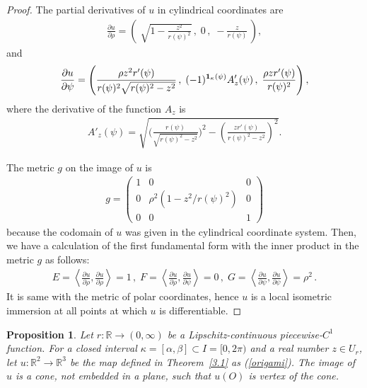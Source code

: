 \documentclass{amsart}
\theoremstyle{plain}
\newtheorem{proposition}[theorem]{Proposition}
\theoremstyle{definition}
\theoremstyle{remark}
\begin{document}
\begin{proof}%
The partial derivatives of $u$ in cylindrical coordinates are
\begin{align*}
\frac{\partial u}{\partial\rho}=\left(\;\sqrt{1-\frac{z^2}{r(\psi)^2}}\,,\;0\,,\;-\frac{z}{r(\psi)}\,\right),
\end{align*}
and
\begin{align*}
\frac{\partial u}{\partial\psi}=\left(\frac{\rho z^2r'(\psi)}{r(\psi)^2\sqrt{r(\psi)^2-z^2}}\,,\;(-1)^{\bold{1}_{\kappa}(\psi)}A'_z(\psi)\,,\;\frac{\rho zr'(\psi)}{r(\psi)^2}\right),
\end{align*}
where the derivative of the function $A_z$ is
\begin{align*}
A'_z(\psi)=\sqrt{\biggl(\frac{r(\psi)}{\sqrt{r(\psi)^2-z^2}}\biggr)^2-\left(\frac{zr'(\psi)}{r(\psi)^2-z^2}\right)^2}.
\end{align*}

The metric $g$ on the image of $u$ is
\begin{align*}
g=\begin{pmatrix}1&0&0\\0&\rho^2\left(1- {z^2}/{r(\psi)^2}\right)&0\\0&0&1\end{pmatrix}
\end{align*}
because the codomain of $u$ was given in the cylindrical coordinate system.
Then, we have a calculation of the first fundamental form with the inner product in the metric $g$ as follows:
\begin{align*}
E=\left\langle\frac{\partial u}{\partial\rho},\frac{\partial u}{\partial\rho}\right\rangle=1\,,\;
F=\left\langle\frac{\partial u}{\partial\rho},\frac{\partial u}{\partial\psi}\right\rangle=0\,,\;
G=\left\langle\frac{\partial u}{\partial\psi},\frac{\partial u}{\partial\psi}\right\rangle=\rho^2\,.
\end{align*}
It is same with the metric of polar coordinates, hence $u$ is a local isometric immersion at all points at which $u$ is differentiable.
\end{proof}





\begin{proposition}\label{4.2} %
Let $r \colon \mathbb{R}\to(0,\infty)$ be a Lipschitz-continuous piecewise-$C^1$ function. 
For a closed interval $\kappa=[\alpha,\beta]\subset I=[0,2\pi)$ and a real number $z\in U_r$, let $u \colon \mathbb{R}^2\to\mathbb{R}^3$ be the map defined in Theorem~\ref{3.1} as (\ref{origami}).
The image of $u$ is a cone, not embedded in a plane, such that $u(O)$ is vertex of the cone.
\end{proposition}
\end{document}

